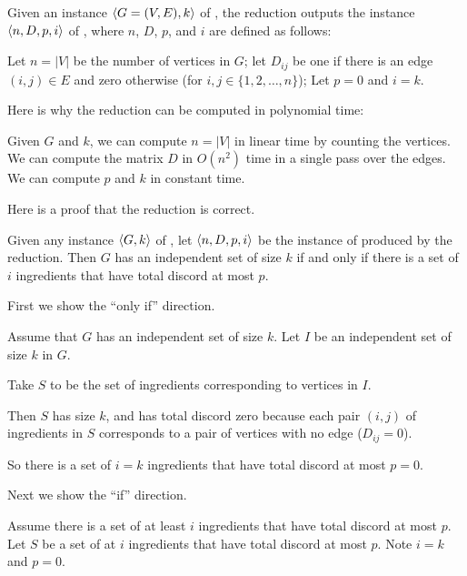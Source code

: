 \documentclass[11pt]{article}
\begin{document}
\begin{problems}


  \problem %

  Given an instance $\langle G=(V,E),k \rangle$ of ,
  the reduction outputs the instance $\langle n, D, p, i \rangle$ of ,
  where $n$, $D$, $p$, and $i$ are defined as follows:

  \lineacross 

  Let $n= |V|$ be the number of vertices in $G$;
  let $D_{ij}$ be one if there is an edge $(i,j)\in E$ and zero otherwise (for $i,j\in\{1,2,\ldots,n\}$);
  Let $p=0$ and $i=k$.
  
  \lineacross 

  \medskip 
  Here is why the reduction can be computed in polynomial time:
  
  \lineacross 

  Given $G$ and $k$, we can compute $n=|V|$ in linear time by counting the vertices.
  We can compute the matrix $D$ in $O(n^2)$ time in a single pass over the edges.
  We can compute $p$ and $k$ in constant time.

  \lineacross 
  
  \medskip 
  Here is a proof that the reduction is correct.
  \begin{lemma}
    Given any instance $\langle G,k \rangle$ of ,
    let $\langle n, D, p, i \rangle$ be the instance of  produced by the reduction.
    Then $G$ has an independent set of size $k$
    if and only if there is a set of $i$ ingredients that have total discord at most $p$.
  \end{lemma}
  \begin{longFormProof}
    \step First we show the ``only if'' direction.
    \begin{block}[1oi]
      {Assume that $G$ has an independent set of size $k$.}
      \step Let $I$ be an independent set of size $k$ in $G$.
      \smallskip 

      \step Take $S$ to be the set of ingredients corresponding to vertices in $I$.

      \step Then $S$ has size $k$, and has total discord zero
      because each pair $(i,j)$ of ingredients in $S$ corresponds to a pair of vertices
      with no edge ($D_{ij}=0$).

      \smallskip 
      \step So there is a set of $i=k$ ingredients that have total discord at most $p=0$.
    \end{block} 
    \step Next we show the ``if'' direction.
    \begin{block}[1i]
      {Assume there is a set of at least $i$ ingredients that have total discord at most $p$.}
      \step Let $S$ be a set of at $i$ ingredients that have total discord at most $p$.  Note $i=k$ and $p=0$.
      \smallskip 


\end{block}
\end{longFormProof}
\end{problems}
\end{document}
